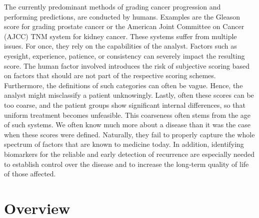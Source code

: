 The currently predominant methods of grading cancer progression and performing predictions, are conducted by humans. Examples are the Gleason score for grading prostate cancer or the American Joint Committee on Cancer (AJCC) TNM system for kidney cancer.
These systems suffer from multiple issues. For once, they rely on the capabilities of the analyst. Factors such as eyesight, experience, patience, or consistency can severely impact the resulting score. The human factor involved introduces the risk of subjective scoring based on factors that should are not part of the respective scoring schemes. Furthermore, the definitions of such categories can often be vague. Hence, the analyst might misclassify a patient unknowingly. Lastly, often these scores can be too coarse, and the patient groups show significant internal differences, so that uniform treatment becomes unfeasible. This coarseness often stems from the age of such systems. We often know much more about a disease than it was the case when these scores were defined. Naturally, they fail to properly capture the whole spectrum of factors that are known to medicine today. 
In addition, identifying biomarkers for the reliable and early detection of recurrence are especially needed to establish control over the disease and to increase the long-term quality of life of those affected. 

\section{Overview}

